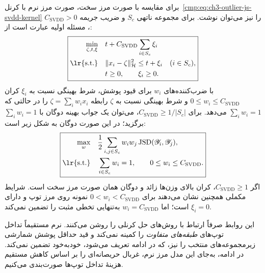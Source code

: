 برای مقایسه با صورت مرز سخت،
صورت مرز نرم 
با کرنل~\eqref{cmp:eq:ch3-outlier-js-svdd-kernel}
را نیز می‌توان نوشت.
برای مجموعه ناتهی $S_c$
و ضریب جریمه
$C_{\mathrm{SVDD}}>0$،
مسئله اولیه عبارت است از:
\begin{equation}\label{cmp:eq:ch3-outlier-js-svdd-soft-primal}
\boxed{
\begin{aligned}
\min_{\zeta,t,\xi}\quad&
t+C_{\mathrm{SVDD}}\sum_{i\in S_c}\xi_i\\
\text{\lr{s.t.}}\quad&
\|x_i-\zeta\|_{\mathcal H}^2
\le t+\xi_i\quad(i\in S_c),\\
&t\ge0,\qquad \xi_i\ge0.
\end{aligned}}
\end{equation}
با ضرب‌کننده‌های $w_i$
برای قیود پوشش،
شرط بهینگی نسبت به
$\xi_i$ کران
$0\le w_i\le C_{\mathrm{SVDD}}$
و شرط بهینگی نسبت به
$\zeta$ رابطه
$\zeta=\sum_iw_ix_i$
را در حالتی که
$\sum_iw_i=1$ می‌دهد.
برای $C_{\mathrm{SVDD}}\ge
1/|S_c|$، می‌توان
یک جواب بهینه دوگان با
$\sum_iw_i=1$ برگزید؛
در این صورت دوگان
به شکل زیر است:
\begin{equation}\label{cmp:eq:ch3-outlier-js-svdd-soft-dual}
\boxed{
\begin{aligned}
\max_{w}\quad&
\frac12\sum_{i,j\in S_c}
w_iw_j\operatorname{JSD}
(\mathscr Y_i,\mathscr Y_j),\\
\text{\lr{s.t.}}\quad&
\sum_{i\in S_c}w_i=1,\qquad
0\le w_i\le C_{\mathrm{SVDD}}.
\end{aligned}}
\end{equation}
اگر $C_{\mathrm{SVDD}}\ge1$،
کران بالای وزن‌ها زائد
و دوگان همان صورت
مرز سخت است.
شرایط مکملی همچنین
نشان می‌دهند برای
$0<w_i<C_{\mathrm{SVDD}}$
نمونه روی مرز توپ
و دارای $\xi_i=0$ است؛
اما $w_i=C_{\mathrm{SVDD}}$
به‌تنهایی تخطی مثبت
را تضمین نمی‌کند.

این روابط صرفاً ارتباط
با روش‌های حل کرنلی را
روشن می‌کنند. 
نرم مستقیماً تداخل
توپ‌های \emph{طبقه‌های متفاوت}
را کمینه نمی‌کند و
قید حداقل پوشش شمارشی
زیرمجموعه‌های منتخب را نیز،
که در ادامه تعریف می‌شود،
خودبه‌خود تضمین نمی‌کند. در ادامه، به‌جای این
مدل مرز نرم، غربال حریصانه‌ای
را بر اساس کاهش مستقیم هزینهٔ
تداخل توپ‌ها صورت‌بندی می‌کنیم.

